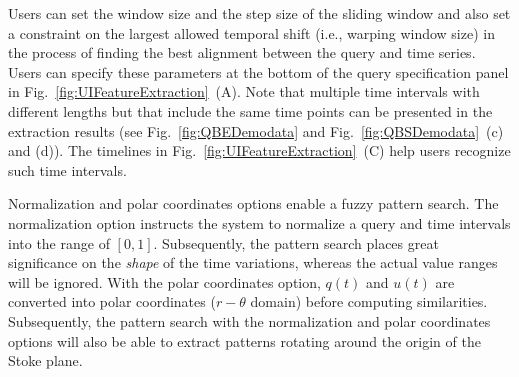 Users can set the window size and the step size of the sliding window and also set a constraint on the largest allowed temporal shift (i.e., warping window size)
in the process of finding the best alignment between the query and time series.
Users can specify these parameters at the bottom of the query specification panel in Fig.~\ref{fig:UIFeatureExtraction}~(A).
Note that multiple time intervals with different lengths but that include the same time points can be presented in the extraction results (see Fig.~\ref{fig:QBEDemodata} and Fig.~\ref{fig:QBSDemodata}~(c) and (d)). %
The timelines in Fig.~\ref{fig:UIFeatureExtraction}~(C) help users recognize such time intervals. 

Normalization and polar coordinates options enable a fuzzy pattern search.
The normalization option instructs the system to normalize a query and time intervals into the range of $[0, 1]$.
Subsequently, the pattern search places great significance on the \emph{shape} of the time variations, whereas the actual value ranges will be ignored.
With the polar coordinates option, 
$q(t)$ and $u(t)$ are converted into polar coordinates ($r-\theta$ domain) before computing similarities.
Subsequently, the pattern search with the normalization and polar coordinates options will also be able to extract patterns rotating around the origin of the Stoke plane.

%
%
